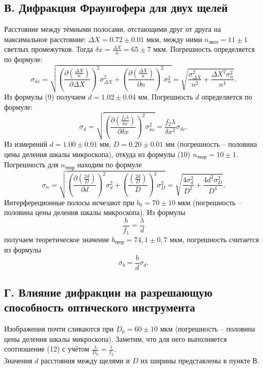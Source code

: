 \documentclass[a4paper,12pt]{article}
\begin{document}
\subsection*{В. Дифракция Фраунгофера для двух щелей}
Расстояние между тёмными полосами, отстающими друг от друга на максимальное расстояние: $\Delta X = 0.72 \pm 0.01 \text{  мкм}$, между ними $n_{\text{эксп}} = 11 \pm 1$ светлых промежутков. Тогда $\delta x = \frac{\Delta X}{n} = 65 \pm 7 \text{ мкм}$. Погрешность определяется по формуле:
$$
\sigma_{\delta x} = \sqrt{\left(\dfrac{\partial \left(\frac{\Delta X}{n}\right)}{\partial \Delta X}\right)^2 \sigma^2_{\Delta X} + \left(\dfrac{\partial \left(\frac{\Delta X}{n}\right)}{\partial n}\right)^2 \sigma^2_{n}} =\sqrt{\dfrac{\sigma^2_{\Delta X}}{n^2} + \dfrac{\Delta X^2 \sigma^2_{n}}{n^4}}.
$$
Из формулы (9) получаем $d = 1.02 \pm 0.04 \text{ мм}$. Погрешность $d$ определяется по формуле:
$$
\sigma_d = \sqrt{ \left(\frac{\partial \left(\frac{f_2\lambda}{\delta x}\right)}{\partial \delta x}\right)^2 \sigma^2_{\delta x}} = \dfrac{f_2 \lambda}{\delta x^2} \sigma_{\delta x}.
$$
Из измерений $d = 1.00 \pm 0.01 \text{ мм}$, $D = 0.20 \pm 0.01 \text{ мм}$ (погрешность -- половина цены деления шкалы микроскопа), откуда из формулы (10) $n_{\text{теор}} = 10 \pm 1$. Погрешность для $n_{\text{теор}}$ находим по формуле
$$
\sigma_n = \sqrt{\left( \frac{\partial \left( \frac{2d}{D}\right)}{\partial d} \right)^2 \sigma_d^2 + \left( \dfrac{\left(\frac{2d}{D}\right)}{D}\right)^2 \sigma_D^2} = \sqrt{\dfrac{4 \sigma_d^2}{D^2} + \dfrac{4d^2 \sigma_D^2}{D^4}}.
$$
Интерфереционные полосы исчезают при $b_0 = 70 \pm 10 \text{ мкм}$ (погрешность -- половина цены деления шкалы микроскопа). Из формулы 
\begin{equation}
\dfrac{b}{f_1} = \dfrac{\lambda}{d}
\end{equation}
получаем теоретическое значение $b_{\text{теор}} = 74,1 \pm 0,7 \text{ мкм}$, погрешность считается из формулы
$$
\sigma_{b} = \dfrac{b}{d}\sigma_d.
$$
\subsection*{Г. Влияние дифракции на разрешающую способность оптического инструмента}
Изображения почти сливаются при $D_0 = 60 \pm 10 \text{ мкм}$ (погрешность -- половина цены деления шкалы микроскопа). Заметим, что для него выполняется соотношение (12) с учётом $\frac{\lambda}{D_0} = \frac{l}{f_2}$.\\
Значения $d$ расстояния между щелями и $D$ их ширины представлены в пункте В. 
\end{document}
